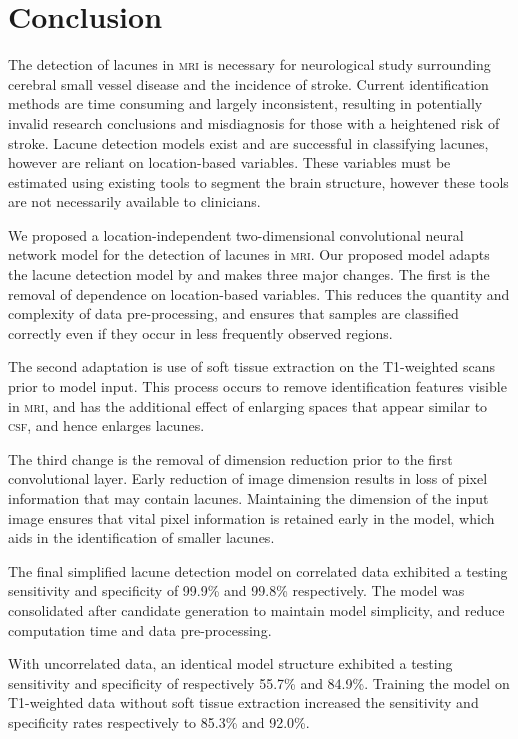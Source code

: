 %
%

\chapter{Conclusion}\label{conclusion}

The detection of lacunes in \textsc{mri} is necessary for neurological study surrounding cerebral small vessel disease and the incidence of stroke. Current identification methods are time consuming and largely inconsistent, resulting in potentially invalid research conclusions and misdiagnosis for those with a heightened risk of stroke. Lacune detection models exist and are successful in classifying lacunes, however are reliant on location-based variables. These variables must be estimated using existing tools to segment the brain structure, however these tools are not necessarily available to clinicians. 

We proposed a location-independent two-dimensional convolutional neural network model for the detection of lacunes in \textsc{mri}. Our proposed model adapts the lacune detection model by \cite{GhafoorianM.2017Dml3} and makes three major changes. The first is the removal of dependence on location-based variables. This reduces the quantity and complexity of data pre-processing, and ensures that samples are classified correctly even if they occur in less frequently observed regions.

The second adaptation is use of soft tissue extraction on the T1-weighted scans prior to model input. This process occurs to remove identification features visible in \textsc{mri}, and has the additional effect of enlarging spaces that appear similar to \textsc{csf}, and hence enlarges lacunes.

The third change is the removal of dimension reduction prior to the first convolutional layer. Early reduction of image dimension results in loss of pixel information that may contain lacunes. Maintaining the dimension of the input image ensures that vital pixel information is retained early in the model, which aids in the identification of smaller lacunes.

The final simplified lacune detection model on correlated data exhibited a testing sensitivity and specificity of 99.9\% and 99.8\% respectively. The model was consolidated after candidate generation to maintain model simplicity, and reduce computation time and data pre-processing.

With uncorrelated data, an identical model structure exhibited a testing sensitivity and specificity of respectively 55.7\% and 84.9\%. Training the model on T1-weighted data without soft tissue extraction increased the sensitivity and specificity rates respectively to 85.3\% and 92.0\%. 

